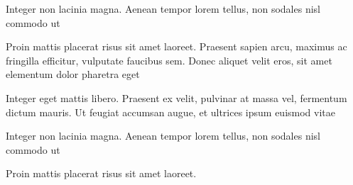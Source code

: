 \begin{alineascomponto}
	\item Integer non lacinia magna. Aenean tempor lorem tellus, non sodales nisl commodo ut
	\item Proin mattis placerat risus sit amet laoreet. Praesent sapien arcu, maximus ac fringilla efficitur, vulputate faucibus sem. Donec aliquet velit eros, sit amet elementum dolor pharetra eget
	\item Integer eget mattis libero. Praesent ex velit, pulvinar at massa vel, fermentum dictum mauris. Ut feugiat accumsan augue, et ultrices ipsum euismod vitae
	\begin{subalineascomponto}
		\item Integer non lacinia magna. Aenean tempor lorem tellus, non sodales nisl commodo ut
		\item Proin mattis placerat risus sit amet laoreet.
	\end{subalineascomponto}
\end{alineascomponto}